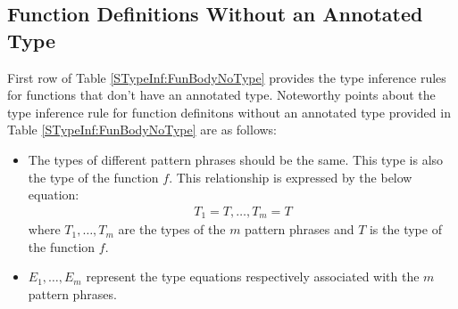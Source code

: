 \documentclass[11pt]{article}
\begin{document}
\subsection {Function Definitions Without an Annotated Type}\label{STypeInf:FDefnNType}

First row of Table \ref {STypeInf:FunBodyNoType} provides the type inference rules for functions that don't have an annotated type. Noteworthy points about the type inference rule for function definitons without an annotated type provided in Table \ref {STypeInf:FunBodyNoType} are as follows:
\begin{itemize} 
  \item The types of different pattern phrases should be the same. This type is also the type of the function ${f}$. This relationship is expressed by the below equation:
  \begin{align*}
  T_1 = T,\ldots,T_m = T
  \end{align*}
where ${T_1,\ldots,T_m}$ are the types of the ${m}$ pattern phrases and ${T}$ is the type of the function ${f}$.
  \item ${E_1,\ldots,E_m}$ represent the type equations respectively associated with the ${m}$ pattern phrases.
\end{itemize}
\end{document}
